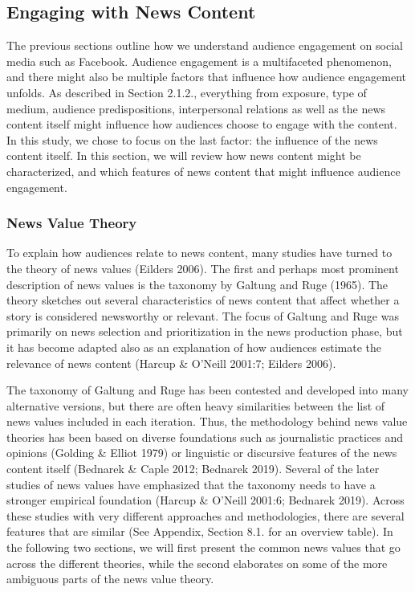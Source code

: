 \documentclass[
]{article}
\begin{document}
\hypertarget{engaging-with-news-content}{%
\subsection{Engaging with News
Content}\label{engaging-with-news-content}}

The previous sections outline how we understand audience engagement on
social media such as Facebook. Audience engagement is a multifaceted
phenomenon, and there might also be multiple factors that influence how
audience engagement unfolds. As described in Section 2.1.2., everything
from exposure, type of medium, audience predispositions, interpersonal
relations as well as the news content itself might influence how
audiences choose to engage with the content. In this study, we chose to
focus on the last factor: the influence of the news content itself. In
this section, we will review how news content might be characterized,
and which features of news content that might influence audience
engagement.

\hypertarget{news-value-theory}{%
\subsubsection{News Value Theory}\label{news-value-theory}}

\noindent To explain how audiences relate to news content, many studies
have turned to the theory of news values (Eilders 2006). The first and
perhaps most prominent description of news values is the taxonomy by
Galtung and Ruge (1965). The theory sketches out several characteristics
of news content that affect whether a story is considered newsworthy or
relevant. The focus of Galtung and Ruge was primarily on news selection
and prioritization in the news production phase, but it has become
adapted also as an explanation of how audiences estimate the relevance
of news content (Harcup \& O'Neill 2001:7; Eilders 2006).

The taxonomy of Galtung and Ruge has been contested and developed into
many alternative versions, but there are often heavy similarities
between the list of news values included in each iteration. Thus, the
methodology behind news value theories has been based on diverse
foundations such as journalistic practices and opinions (Golding \&
Elliot 1979) or linguistic or discursive features of the news content
itself (Bednarek \& Caple 2012; Bednarek 2019). Several of the later
studies of news values have emphasized that the taxonomy needs to have a
stronger empirical foundation (Harcup \& O'Neill 2001:6; Bednarek 2019).
Across these studies with very different approaches and methodologies,
there are several features that are similar (See Appendix, Section 8.1.
for an overview table). In the following two sections, we will first
present the common news values that go across the different theories,
while the second elaborates on some of the more ambiguous parts of the
news value theory.
\end{document}
